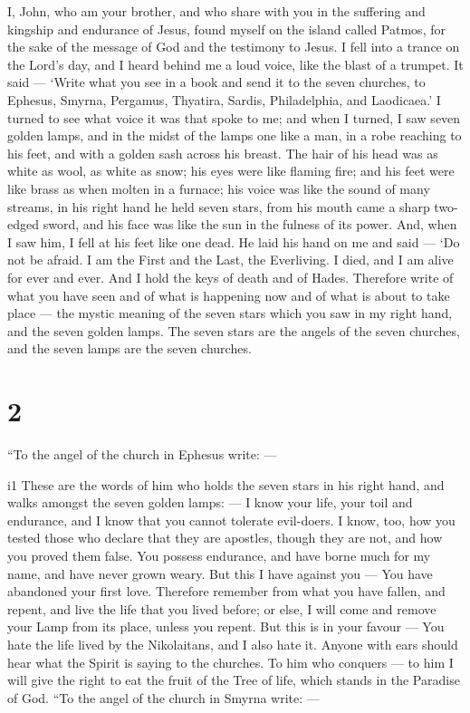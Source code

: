  I, John, who am your brother, and who share with you in the
suffering and kingship and endurance of Jesus, found myself on the
island called Patmos, for the sake of the message of God and the
testimony to Jesus.  I fell into a trance on the Lord's
day, and I heard behind me a loud voice, like the blast of a trumpet.
 It said --- `Write what you see in a book and send it to
the seven churches, to Ephesus, Smyrna, Pergamus, Thyatira, Sardis,
Philadelphia, and Laodicaea.'  I turned to see what voice
it was that spoke to me; and when I turned, I saw seven golden lamps,
 and in the midst of the lamps one like a man, in a robe
reaching to his feet, and with a golden sash across his breast.
 The hair of his head was as white as wool, as white as
snow; his eyes were like flaming fire;  and his feet were
like brass as when molten in a furnace; his voice was like the sound of
many streams,  in his right hand he held seven stars, from
his mouth came a sharp two-edged sword, and his face was like the sun in
the fulness of its power.  And, when I saw him, I fell at
his feet like one dead. He laid his hand on me and said --- `Do not be
afraid. I am the First and the Last,  the Everliving. I
died, and I am alive for ever and ever. And I hold the keys of death and
of Hades.  Therefore write of what you have seen and of
what is happening now and of what is about to take place ---
 the mystic meaning of the seven stars which you saw in my
right hand, and the seven golden lamps. The seven stars are the angels
of the seven churches, and the seven lamps are the seven churches.

\hypertarget{section-1}{%
\section{2}\label{section-1}}

 ``To the angel of the church in Ephesus write: ---

i1 These are the words of him who holds the seven stars in his right
hand, and walks amongst the seven golden lamps: ---  I know
your life, your toil and endurance, and I know that you cannot tolerate
evil-doers. I know, too, how you tested those who declare that they are
apostles, though they are not, and how you proved them false.
 You possess endurance, and have borne much for my name, and
have never grown weary.  But this I have against you --- You
have abandoned your first love.  Therefore remember from
what you have fallen, and repent, and live the life that you lived
before; or else, I will come and remove your Lamp from its place, unless
you repent.  But this is in your favour --- You hate the
life lived by the Nikolaitans, and I also hate it.  Anyone
with ears should hear what the Spirit is saying to the churches. To him
who conquers --- to him I will give the right to eat the fruit of the
Tree of life, which stands in the Paradise of God.  ``To the
angel of the church in Smyrna write: ---

